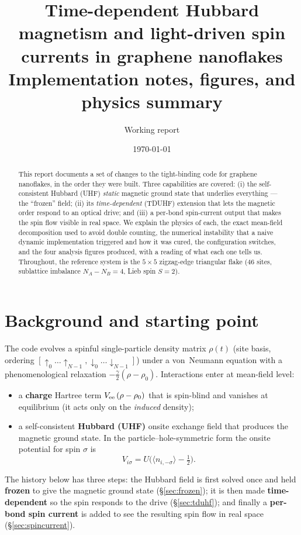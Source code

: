 \documentclass[11pt]{article}
\title{\textbf{Time-dependent Hubbard magnetism and light-driven spin
currents in graphene nanoflakes}\\[4pt]
\large Implementation notes, figures, and physics summary}
\author{Working report}
\date{\today}
\begin{document}
\maketitle

\begin{abstract}
This report documents a set of changes to the tight-binding code for graphene
nanoflakes, in the order they were built. Three capabilities are covered:
(i) the self-consistent Hubbard (UHF) \emph{static} magnetic ground state that
underlies everything --- the ``frozen'' field; (ii) its \emph{time-dependent}
(TDUHF) extension that lets the magnetic order respond to an optical drive; and
(iii) a per-bond spin-current output that makes the spin flow visible in real
space. We explain the physics of each, the exact mean-field decomposition used
to avoid double counting, the numerical instability that a naive dynamic
implementation triggered and how it was cured, the configuration switches, and
the four analysis figures produced, with a reading of what each one tells us.
Throughout, the reference system is the $5\times5$ zigzag-edge triangular flake
(46 sites, sublattice imbalance $N_A-N_B=4$, Lieb spin $S=2$).
\end{abstract}

\tableofcontents

\section{Background and starting point}
The code evolves a spinful single-particle density matrix $\rho(t)$ (site basis,
ordering $[\uparrow_0\ldots\uparrow_{N-1},\downarrow_0\ldots\downarrow_{N-1}]$)
under a von~Neumann equation with a phenomenological relaxation
$-\tfrac{\gamma}{2}(\rho-\rho_0)$. Interactions enter at mean-field level:
\begin{itemize}
\item a \textbf{charge} Hartree term $V_{\rm ee}\,(\rho-\rho_0)$ that is
spin-blind and vanishes at equilibrium (it acts only on the \emph{induced}
density);
\item a self-consistent \textbf{Hubbard (UHF)} onsite exchange field that
produces the magnetic ground state. In the particle--hole-symmetric form the
onsite potential for spin $\sigma$ is
\begin{equation}
V_{i\sigma} = U\big(\langle n_{i,-\sigma}\rangle - \tfrac12\big).
\label{eq:uhf}
\end{equation}
\end{itemize}
The history below has three steps: the Hubbard field is first solved once and
held \textbf{frozen} to give the magnetic ground state (\S\ref{sec:frozen}); it
is then made \textbf{time-dependent} so the spin responds to the drive
(\S\ref{sec:tduhf}); and finally a \textbf{per-bond spin current} is added to see
the resulting spin flow in real space (\S\ref{sec:spincurrent}).
\end{document}
